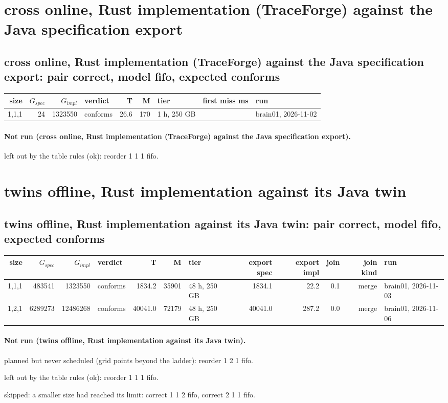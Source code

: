 \documentclass[10pt]{article}
\begin{document}
\section*{cross online, Rust implementation (TraceForge) against the Java specification export}
\subsection*{cross online, Rust implementation (TraceForge) against the Java specification export: pair \textsf{correct}, model fifo, expected conforms}
\begin{longtable}{@{}rrrlrrlrl@{}}
\toprule
size & $G_{\mathit{spec}}$ & $G_{\mathit{impl}}$ & verdict & T & M & tier & first miss ms & run \\
\midrule
\endhead
\color{red} 1,1,1 & 24 & 1323550 & conforms & 26.6 & 170 & 1 h, 250 GB &  & brain01, 2026-11-02 \\
\bottomrule
\end{longtable}
\paragraph{Not run (cross online, Rust implementation (TraceForge) against the Java specification export).}
left out by the table rules (ok): reorder 1 1 1 fifo.\par
\section*{twins offline, Rust implementation against its Java twin}
\subsection*{twins offline, Rust implementation against its Java twin: pair \textsf{correct}, model fifo, expected conforms}
\begin{longtable}{@{}rrrlrrlrrrrl@{}}
\toprule
size & $G_{\mathit{spec}}$ & $G_{\mathit{impl}}$ & verdict & T & M & tier & export spec & export impl & join & join kind & run \\
\midrule
\endhead
\color{blue} 1,1,1 & 483541 & 1323550 & conforms & 1834.2 & 35901 & 48 h, 250 GB & 1834.1 & 22.2 & 0.1 & merge & brain01, 2026-11-03 \\
\color{blue} 1,2,1 & 6289273 & 12486268 & conforms & 40041.0 & 72179 & 48 h, 250 GB & 40041.0 & 287.2 & 0.0 & merge & brain01, 2026-11-06 \\
\bottomrule
\end{longtable}
\paragraph{Not run (twins offline, Rust implementation against its Java twin).}
planned but never scheduled (grid points beyond the ladder): reorder 1 2 1 fifo.\par
left out by the table rules (ok): reorder 1 1 1 fifo.\par
skipped: a smaller size had reached its limit: correct 1 1 2 fifo, correct 2 1 1 fifo.\par
\end{document}
